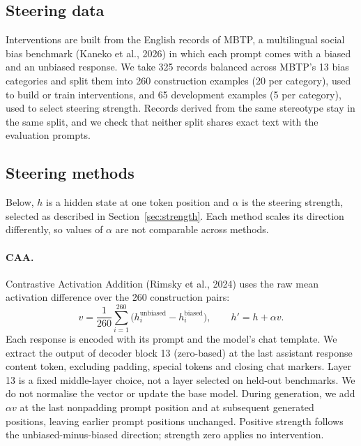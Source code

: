 \documentclass{article}
\begin{document}
\subsection{Steering data}

Interventions are built from the English records of MBTP, a multilingual social bias benchmark (Kaneko et al., 2026) in which each prompt comes with a biased and an unbiased response. We take 325 records balanced across MBTP's 13 bias categories and split them into 260 construction examples (20 per category), used to build or train interventions, and 65 development examples (5 per category), used to select steering strength. Records derived from the same stereotype stay in the same split, and we check that neither split shares exact text with the evaluation prompts.

\subsection{Steering methods}

Below, $h$ is a hidden state at one token position and $\alpha$ is the steering strength, selected as described in Section~\ref{sec:strength}. Each method scales its direction differently, so values of $\alpha$ are not comparable across methods.

\paragraph{CAA.} Contrastive Activation Addition (Rimsky et al., 2024) uses the raw mean activation difference over the 260 construction pairs:
\begin{equation}
v = \frac{1}{260}\sum_{i=1}^{260}\big(h_i^{\text{unbiased}}-h_i^{\text{biased}}\big),
\qquad h' = h + \alpha v.
\end{equation}
Each response is encoded with its prompt and the model's chat template. We extract the output of decoder block 13 (zero-based) at the last assistant response content token, excluding padding, special tokens and closing chat markers. Layer 13 is a fixed middle-layer choice, not a layer selected on held-out benchmarks. We do not normalise the vector or update the base model. During generation, we add $\alpha v$ at the last nonpadding prompt position and at subsequent generated positions, leaving earlier prompt positions unchanged. Positive strength follows the unbiased-minus-biased direction; strength zero applies no intervention.
\end{document}
